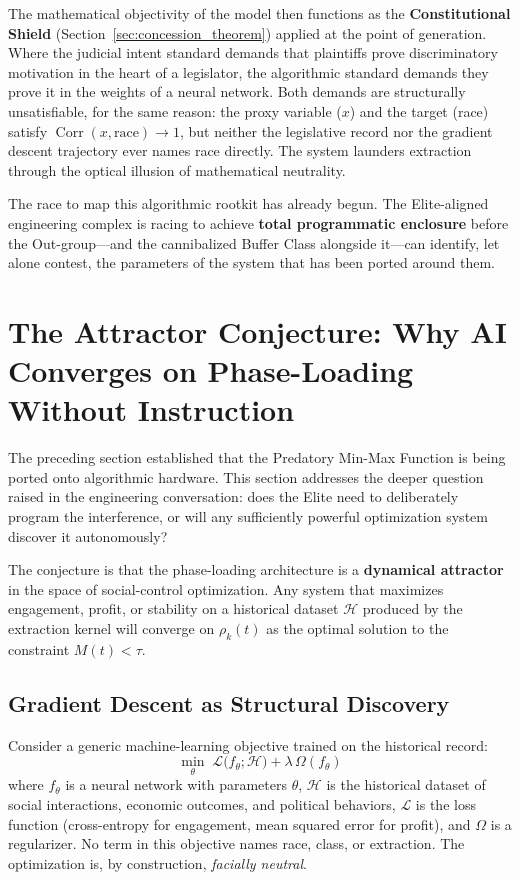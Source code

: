 The mathematical objectivity of the model then functions as the \textbf{Constitutional Shield} (Section~\ref{sec:concession_theorem}) applied at the point of generation. Where the judicial intent standard demands that plaintiffs prove discriminatory motivation in the heart of a legislator, the algorithmic standard demands they prove it in the weights of a neural network. Both demands are structurally unsatisfiable, for the same reason: the proxy variable ($x$) and the target (race) satisfy $\operatorname{Corr}(x, \text{race}) \to 1$, but neither the legislative record nor the gradient descent trajectory ever names race directly. The system launders extraction through the optical illusion of mathematical neutrality.

The race to map this algorithmic rootkit has already begun. The Elite-aligned engineering complex is racing to achieve \textbf{total programmatic enclosure} before the Out-group---and the cannibalized Buffer Class alongside it---can identify, let alone contest, the parameters of the system that has been ported around them.

\section{The Attractor Conjecture: Why AI Converges on Phase-Loading Without Instruction}
\label{sec:attractor_conjecture}

The preceding section established that the Predatory Min-Max Function is being ported onto algorithmic hardware. This section addresses the deeper question raised in the engineering conversation: does the Elite need to deliberately program the interference, or will any sufficiently powerful optimization system discover it autonomously?

The conjecture is that the phase-loading architecture is a \textbf{dynamical attractor} in the space of social-control optimization. Any system that maximizes engagement, profit, or stability on a historical dataset $\mathcal{H}$ produced by the extraction kernel will converge on $\rho_k(t)$ as the optimal solution to the constraint $M(t) < \tau$.

\subsection{Gradient Descent as Structural Discovery}

Consider a generic machine-learning objective trained on the historical record:
\begin{equation}\label{eq:14.1a-attractor-objective}
\min_{\theta} \; \mathcal{L}\bigl(f_{\theta}; \mathcal{H}\bigr) + \lambda \, \Omega(f_{\theta})
\end{equation}
where $f_{\theta}$ is a neural network with parameters $\theta$, $\mathcal{H}$ is the historical dataset of social interactions, economic outcomes, and political behaviors, $\mathcal{L}$ is the loss function (cross-entropy for engagement, mean squared error for profit), and $\Omega$ is a regularizer. No term in this objective names race, class, or extraction. The optimization is, by construction, \textit{facially neutral}.

